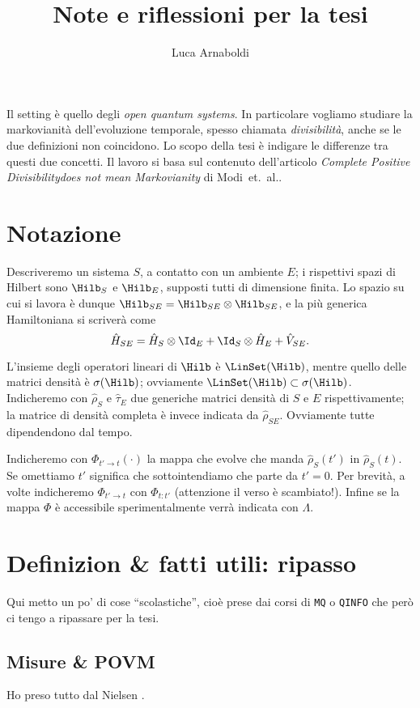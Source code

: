 \documentclass[a4]{article}
\title{Note e riflessioni per la tesi}
\author{Luca Arnaboldi}
\begin{document}
\maketitle
\tableofcontents
\vspace{6pt}
Il setting è quello degli \emph{open quantum systems}. In particolare vogliamo studiare
la markovianità dell'evoluzione temporale, spesso chiamata \emph{divisibilità}, anche se
le due definizioni non coincidono. Lo scopo della tesi è indigare le differenze tra questi
due concetti. Il lavoro si basa sul contenuto dell'articolo \emph{Complete Positive
Divisibilitydoes not mean Markovianity} di Modi~et.~al.\cite{CPdoesnotimply}.

\section{Notazione}
Descriveremo un sistema \(S\), a contatto con un ambiente \(E\); i rispettivi spazi di
Hilbert sono \(\Hilb_S\) e \(\Hilb_E\), supposti tutti di dimensione finita. Lo spazio
su cui si lavora è dunque 
\(\Hilb_{SE} = \Hilb_{SE} \otimes \Hilb_{SE}\), e la più generica Hamiltoniana si
scriverà come
\[\hat{H}_{SE} = \hat{H}_S \otimes  \Id_E + \Id_S \otimes  \hat{H}_E + \hat{V}_{SE}.\]

L'insieme degli operatori lineari di \(\Hilb\) è \(\LinSet(\Hilb)\), mentre quello delle
matrici densità è \(\sigma(\Hilb)\); ovviamente \(\LinSet(\Hilb) \subset \sigma(\Hilb)\).
Indicheremo con \(\hat{\rho}_S\) e \(\hat{\tau}_E\) due generiche matrici densità di \(S\)
e \(E\) rispettivamente; la matrice di densità completa è invece indicata da \(\hat{\rho}_{SE}\).
Ovviamente tutte dipendendono dal tempo.


Indicheremo con \(\Phi_{t'\to t}(\cdot)\) la mappa che evolve che manda \(\hat{\rho}_S(t')\)
in \(\hat{\rho}_S(t)\). Se omettiamo \(t'\) significa che sottointendiamo che parte da \(t'=0\).
Per brevità, a volte indicheremo \(\Phi_{t'\to t}\) con \(\Phi_{t:t'}\) (attenzione il verso è scambiato!).
Infine se la mappa \(\Phi\) è accessibile sperimentalmente verrà indicata con
\(\Lambda\).

\section{Definizion \& fatti utili: ripasso}
Qui metto un po' di cose ``scolastiche'', cioè prese dai corsi di \texttt{MQ} o \texttt{QINFO}
che però ci tengo a ripassare per la tesi.
\subsection{Misure \& POVM}
Ho preso tutto dal Nielsen \cite{nielsen2010quantum}.
\end{document}

